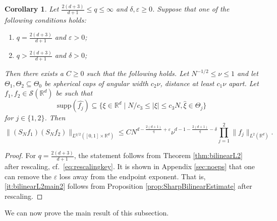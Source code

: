 \documentclass{amsart}
\numberwithin{equation}{section}
\newtheorem{corollary}[theorem]{Corollary}
\theoremstyle{definition}
\newcommand{\R}{\mathbb{R}}
\newcommand{\Rd}{\mathbb{R}^{d}}
\newcommand {\veps}{\varepsilon}
\newcommand {\Sw}{\mathcal{S}}
\newcommand {\supp}{\mathrm{supp}}
\begin{document}
\begin{corollary}\label{cor:bilinearL2main}
Let $\frac{2(d+3)}{d+1}\leq q\leq \infty$ and $\delta,\veps\geq 0$. %
Suppose that one of the following conditions holds:
\begin{enumerate}
    \item\label{it:bilinearL2main1} $q=\frac{2(d+3)}{d+1}$ and $\veps>0$; %
    \item\label{it:bilinearL2main2} $q>\frac{2(d+3)}{d+1}$ and $\delta>0$;%
\end{enumerate}
Then there exists a $C\geq0$ such that the following holds. Let $N^{-1/2}\leq \nu\leq 1$ and let $\Theta_{1},\Theta_{2}\subseteq \Theta_{0}$ be spherical caps of angular width $c_{2}\nu$, distance at least $c_{1}\nu$ apart. Let $f_{1},f_{2}\in\Sw(\Rd)$ be such that  
\begin{equation*}
\supp(\widehat{f_{j}})\subseteq \{ \xi \in \R^d \mid N/c_{3}\leq |\xi|\leq c_{3}N, \hat{\xi}\in\Theta_{j}\}    
\end{equation*}
for $j\in\{1,2\}$. 
Then 
\[
\|(S_{N}f_{1})(S_{N}f_{2})\|_{L^{q/2}([0,1] \times \R^d)}\leq C N^{d - \frac{2(d+1)}{q}+\veps} \nu^{d-1 - \frac{2(d+1)}{q}-\delta} \prod_{j=1}^{2}\| f_{j}\|_{L^{2}(\Rd)}. %
\]
\end{corollary}
\begin{proof}
For $q=\frac{2(d+3)}{d+1}$, the statement follows from Theorem \ref{thm:bilinearL2} after rescaling, cf.~\eqref{eq:rescalingkey}. It is shown in Appendix \ref{sec:noeps} that one can remove the $\veps$ loss away from the endpoint exponent. That is, \eqref{it:bilinearL2main2} follows from Proposition \ref{prop:SharpBilinearEstimate} after rescaling. 
\end{proof}



We can now prove the main result of this subsection.
\end{document}
